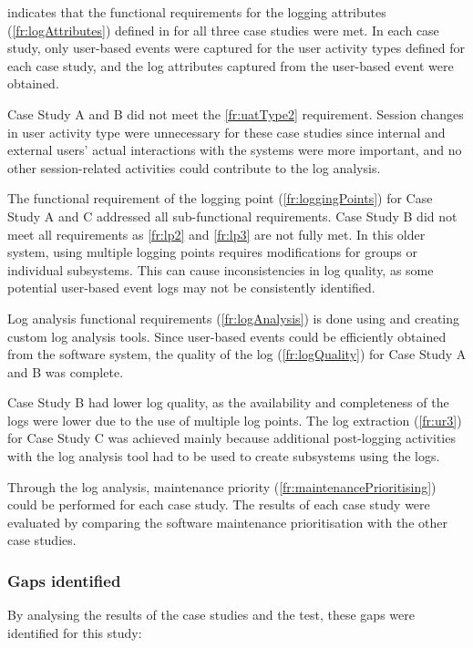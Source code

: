  indicates that the functional requirements for the logging attributes (\ref{fr:logAttributes}) defined in  for all three case studies were met. In each case study, only user-based events were captured for the user activity types defined for each case study, and the log attributes captured from the user-based event were obtained. \par Case Study A and B did not meet the \ref{fr:uatType2} requirement. Session changes in user activity type were unnecessary for these case studies since internal and external users' actual interactions with the systems were more important, and no other session-related activities could contribute to the log analysis. \par The functional requirement of the logging point (\ref{fr:loggingPoints}) for Case Study A and C addressed all sub-functional requirements. Case Study B did not meet all requirements as \ref{fr:lp2} and \ref{fr:lp3} are not fully met. In this older system, using multiple logging points requires modifications for groups or individual subsystems. This can cause inconsistencies in log quality, as some potential user-based event logs may not be consistently identified. \par Log analysis functional requirements (\ref{fr:logAnalysis}) is done using and creating custom log analysis tools. Since user-based events could be efficiently obtained from the software system, the quality of the log (\ref{fr:logQuality}) for Case Study A and B was complete. \par Case Study B had lower log quality, as the availability and completeness of the logs were lower due to the use of multiple log points. The log extraction (\ref{fr:ur3}) for Case Study C was achieved mainly because additional post-logging activities with the log analysis tool had to be used to create subsystems using the logs.\par Through the log analysis, maintenance priority (\ref{fr:maintenancePrioritising}) could be performed for each case study. The results of each case study were evaluated by comparing the software maintenance prioritisation with the other case studies.

\subsubsection{Gaps identified}
By analysing the results of the case studies and the test, these gaps were identified for this study:

